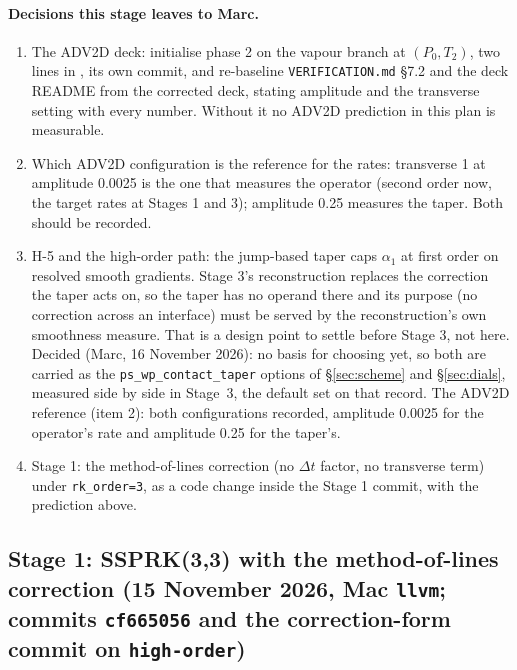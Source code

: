 \documentclass[11pt,a4paper]{article}
\newcommand{\code}[1]{\texttt{\small #1}}
\begin{document}
\paragraph{Decisions this stage leaves to Marc.}
\label{sec:stage0decide}
\begin{enumerate}[nosep]
\item The ADV2D deck: initialise phase 2 on the vapour branch at
      $(P_0, T_2)$, two lines in , its own
      commit, and re-baseline \code{VERIFICATION.md} \S7.2 and the deck
      README from the corrected deck, stating amplitude and the transverse
      setting with every number.  Without it no ADV2D prediction in this
      plan is measurable.
\item Which ADV2D configuration is the reference for the rates:
      transverse 1 at amplitude 0.0025 is the one that measures the
      operator (second order now, the target rates at Stages 1 and 3);
      amplitude 0.25 measures the taper.  Both should be recorded.
\item H-5 and the high-order path: the jump-based taper caps $\alpha_1$ at
      first order on resolved smooth gradients.  Stage 3's reconstruction
      replaces the correction the taper acts on, so the taper has no
      operand there and its purpose (no correction across an interface)
      must be served by the reconstruction's own smoothness measure.  That
      is a design point to settle before Stage 3, not here.  Decided
      (Marc, 16 November 2026): no basis for choosing yet, so both are
      carried as the \code{ps\_wp\_contact\_taper} options of
      \S\ref{sec:scheme} and \S\ref{sec:dials}, measured side by side in
      Stage~3, the default set on that record.  The ADV2D reference
      (item 2): both configurations recorded, amplitude 0.0025 for the
      operator's rate and amplitude 0.25 for the taper's.
\item Stage 1: the method-of-lines correction (no $\Delta t$ factor, no
      transverse term) under \code{rk\_order=3}, as a code change inside
      the Stage 1 commit, with the prediction above.
\end{enumerate}


\subsection{Stage 1: SSPRK(3,3) with the method-of-lines correction (15 November 2026, Mac \code{llvm}; commits \code{cf665056} and the correction-form commit on \code{high-order})}
\label{sec:stage1}
\end{document}
